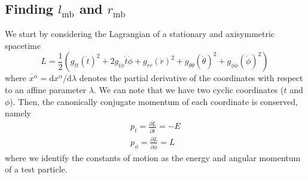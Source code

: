 \documentclass[twocolumn,aps,showpacs,showkeys,prd,superscriptaddress,byrevtex, amsmath]{revtex4-1}
\begin{document}
\begin{appendix}
\section{Finding $l_{\mathrm{mb}}$ and $r_{\mathrm{mb}}$}
\label{ang_mom_appendix}

We start by considering the Lagrangian of a stationary and axisymmetric spacetime
\begin{equation}
L = \frac{1}{2}\left(g_{tt} (\dot{t})^2 + 2 g_{t\phi} \dot{t}\dot{\phi} + g_{rr} (\dot{r})^2 + g_{\theta\theta} (\dot{\theta})^2 + g_{\phi\phi} (\dot{\phi})^2\right)\,
\end{equation}
where $\dot{x^{\alpha}} = \mathrm{d}x^{\alpha}/\mathrm{d}\lambda$ denotes the partial derivative of the coordinates with respect to an affine parameter $\lambda$. We can note that we have two cyclic coordinates ($t$ and $\phi$). Then, the canonically conjugate momentum of each coordinate is conserved, namely
\begin{eqnarray}\label{eq:momenta}
p_t = \frac{\partial L}{\partial \dot{t}} = -E
\\
p_{\phi} = \frac{\partial L}{\partial \dot{\phi}} = L\,
\end{eqnarray}
where we identify the constants of motion as the energy and angular momentum of a test particle.


\end{appendix}
\end{document}
